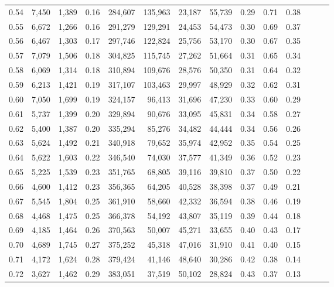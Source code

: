 \begin{tabular}{rrrrrrrrrrrrrr}
0.54 &  7,450 &  1,389 &  0.16 &  284,607 &  135,963 &  23,187 &  55,739 &  0.29 &  0.71 &      0.38 \\
0.55 &  6,672 &  1,266 &  0.16 &  291,279 &  129,291 &  24,453 &  54,473 &  0.30 &  0.69 &      0.37 \\
0.56 &  6,467 &  1,303 &  0.17 &  297,746 &  122,824 &  25,756 &  53,170 &  0.30 &  0.67 &      0.35 \\
0.57 &  7,079 &  1,506 &  0.18 &  304,825 &  115,745 &  27,262 &  51,664 &  0.31 &  0.65 &      0.34 \\
0.58 &  6,069 &  1,314 &  0.18 &  310,894 &  109,676 &  28,576 &  50,350 &  0.31 &  0.64 &      0.32 \\
0.59 &  6,213 &  1,421 &  0.19 &  317,107 &  103,463 &  29,997 &  48,929 &  0.32 &  0.62 &      0.31 \\
0.60 &  7,050 &  1,699 &  0.19 &  324,157 &   96,413 &  31,696 &  47,230 &  0.33 &  0.60 &      0.29 \\
0.61 &  5,737 &  1,399 &  0.20 &  329,894 &   90,676 &  33,095 &  45,831 &  0.34 &  0.58 &      0.27 \\
0.62 &  5,400 &  1,387 &  0.20 &  335,294 &   85,276 &  34,482 &  44,444 &  0.34 &  0.56 &      0.26 \\
0.63 &  5,624 &  1,492 &  0.21 &  340,918 &   79,652 &  35,974 &  42,952 &  0.35 &  0.54 &      0.25 \\
0.64 &  5,622 &  1,603 &  0.22 &  346,540 &   74,030 &  37,577 &  41,349 &  0.36 &  0.52 &      0.23 \\
0.65 &  5,225 &  1,539 &  0.23 &  351,765 &   68,805 &  39,116 &  39,810 &  0.37 &  0.50 &      0.22 \\
0.66 &  4,600 &  1,412 &  0.23 &  356,365 &   64,205 &  40,528 &  38,398 &  0.37 &  0.49 &      0.21 \\
0.67 &  5,545 &  1,804 &  0.25 &  361,910 &   58,660 &  42,332 &  36,594 &  0.38 &  0.46 &      0.19 \\
0.68 &  4,468 &  1,475 &  0.25 &  366,378 &   54,192 &  43,807 &  35,119 &  0.39 &  0.44 &      0.18 \\
0.69 &  4,185 &  1,464 &  0.26 &  370,563 &   50,007 &  45,271 &  33,655 &  0.40 &  0.43 &      0.17 \\
0.70 &  4,689 &  1,745 &  0.27 &  375,252 &   45,318 &  47,016 &  31,910 &  0.41 &  0.40 &      0.15 \\
0.71 &  4,172 &  1,624 &  0.28 &  379,424 &   41,146 &  48,640 &  30,286 &  0.42 &  0.38 &      0.14 \\
0.72 &  3,627 &  1,462 &  0.29 &  383,051 &   37,519 &  50,102 &  28,824 &  0.43 &  0.37 &      0.13 \\

\end{tabular}
